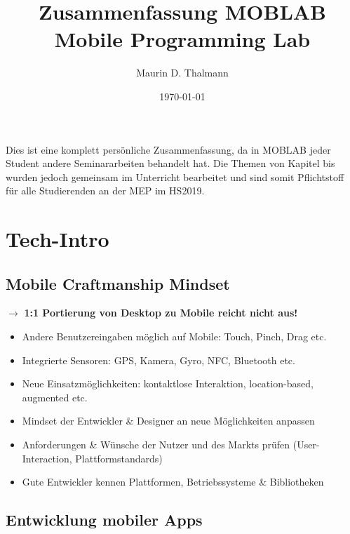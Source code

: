 \documentclass[a4paper]{article}
\title{\textbf{Zusammenfassung MOBLAB} \\
		Mobile Programming Lab}
\date{\today}
\author{Maurin D. Thalmann}
\begin{document}
	
	\maketitle
	
	\newpage
	\noindent
	Dies ist eine komplett persönliche Zusammenfassung, da in MOBLAB jeder Student andere Seminararbeiten behandelt hat.
	Die Themen von Kapitel  bis  wurden jedoch gemeinsam im Unterricht bearbeitet und sind somit Pflichtstoff für alle Studierenden an der MEP im HS2019.
	
	\tableofcontents
	
	\newpage
	
	\section{Tech-Intro}
	\label{section:techintro}
	
		\subsection{Mobile Craftmanship Mindset}
		
		$\rightarrow$ \textbf{1:1 Portierung von Desktop zu Mobile reicht nicht aus!}
	
		\begin{itemize}
			\item Andere Benutzereingaben möglich auf Mobile: Touch, Pinch, Drag etc.
			\item Integrierte Sensoren: GPS, Kamera, Gyro, NFC, Bluetooth etc.
			\item Neue Einsatzmöglichkeiten: kontaktlose Interaktion, location-based, augmented etc.
		\end{itemize}
	
		\vspace{1em}
		
		\begin{itemize}
			\item Mindset der Entwickler \& Designer an neue Möglichkeiten anpassen
			\item Anforderungen \& Wünsche der Nutzer und des Markts prüfen (User-Interaction, Plattformstandards)
			\item Gute Entwickler kennen Plattformen, Betriebssysteme \& Bibliotheken
		\end{itemize}
	
		\subsection{Entwicklung mobiler Apps}
		
\end{document}
